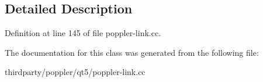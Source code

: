 \subsection{Detailed Description}


Definition at line 145 of file poppler-\/link.\+cc.



The documentation for this class was generated from the following file\+:\begin{DoxyCompactItemize}
\item 
thirdparty/poppler/qt5/poppler-\/link.\+cc\end{DoxyCompactItemize}
